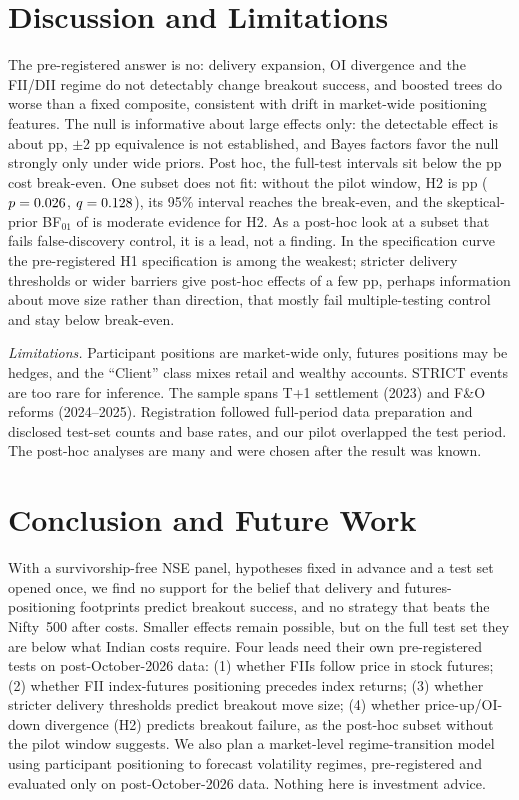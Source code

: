 \documentclass[conference]{IEEEtran}
\begin{document}
\section{Discussion and Limitations}
The pre-registered answer is no: delivery expansion, OI divergence and the FII/DII regime do not detectably
change breakout success, and boosted trees do worse than a fixed composite, consistent with drift in
market-wide positioning features. The null is informative about large effects only: the detectable effect is
about \MDEHOne{} pp, $\pm$2 pp equivalence is not established, and Bayes factors favor the null strongly only
under wide priors. Post hoc, the full-test intervals sit below the \BreakEven{} pp cost break-even. One subset
does not fit: without the pilot window, H2 is \NPHTwoDiff{} pp ($p=0.026$, $q=0.128$), its 95\% interval
reaches the break-even, and the skeptical-prior BF$_{01}$ of \BFNPTwoSkep{} is moderate evidence for H2. As a
post-hoc look at a subset that fails false-discovery control, it is a lead, not a finding. In the
specification curve the pre-registered H1 specification is among the weakest; stricter delivery thresholds or
wider barriers give post-hoc effects of a few pp, perhaps information about move size rather than direction,
that mostly fail multiple-testing control and stay below break-even.

\emph{Limitations.} Participant positions are market-wide only, futures positions may be hedges, and the
``Client'' class mixes retail and wealthy accounts. STRICT events are too rare for inference. The sample spans
T+1 settlement (2023) and F\&O reforms (2024--2025). Registration followed full-period data preparation and
disclosed test-set counts and base rates, and our pilot overlapped the test period. The post-hoc analyses are
many and were chosen after the result was known.

\section{Conclusion and Future Work}
With a survivorship-free NSE panel, hypotheses fixed in advance and a test set opened once, we find no support
for the belief that delivery and futures-positioning footprints predict breakout success, and no strategy that
beats the Nifty~500 after costs. Smaller effects remain possible, but on the full test set they are below what
Indian costs require. Four leads need their own pre-registered tests on post-October-2026 data: (1) whether
FIIs follow price in stock futures; (2) whether FII index-futures positioning precedes index returns; (3)
whether stricter delivery thresholds predict breakout move size; (4) whether price-up/OI-down divergence (H2)
predicts breakout failure, as the post-hoc subset without the pilot window suggests. We also plan a
market-level regime-transition model using participant positioning to forecast volatility regimes,
pre-registered and evaluated only on post-October-2026 data. Nothing here is investment advice.
\end{document}
